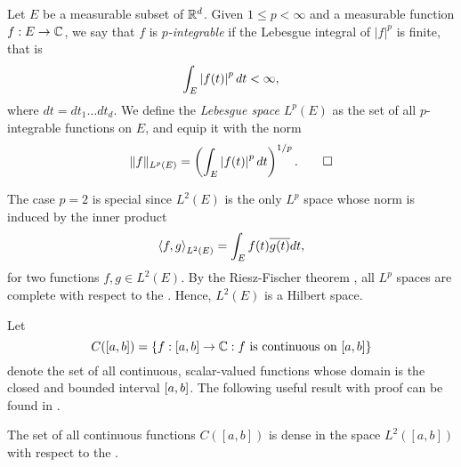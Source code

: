 \documentclass[../thesis.tex]{subfiles}
\begin{document}
\begin{definition}[Lebesgue Space] %
    Let $E$ be a measurable subset of $\mathbb{R}^d$. Given $1 \leq p < \infty$ and a measurable function $f:E\rightarrow \mathbb{C}$, we say that $f$ is \emph{$p$-integrable} if the Lebesgue integral of $|f|^p$ is finite, that is
    \begin{equation*}
        \int_{E} \left|f(t)\right|^p dt < \infty,
    \end{equation*}
    where $dt= dt_1 \dots dt_d$. We define the \emph{Lebesgue space} $L^p(E)$ as the set of all $p$-integrable functions on $E$, and equip it with the norm
    \begin{equation*}
        \|f\|_{L^p(E)} = \left(\int_{E} \left|f(t)\right|^p dt\right)^{1/p}. \qedhere
    \end{equation*}
\end{definition}

The case $p=2$ is special since $L^2(E)$ is the only $L^p$ space whose norm is induced by the inner product
\begin{equation*}
    \left \langle f, g \right \rangle_{L^2(E)} = \int_{E} f(t)\overline{g(t)} dt,
\end{equation*}
for two functions $f,g\in L^2(E)$. By the Riesz-Fischer theorem \cite[p.~279]{heilIntroductionRealAnalysis2019}, all $L^p$ spaces are complete with respect to the \LPnorm. Hence, $L^2(E)$ is a Hilbert space. 


Let
\begin{equation*}  %
    C([a,b]) = \braq{f:[a,b] \rightarrow \mathbb{C}: f \text{ is continuous on } [a,b]}
\end{equation*}
denote the set of all continuous, scalar-valued functions whose domain is the closed and bounded interval $[a,b]$. The following useful result with proof can be found in \cite[p.~326]{rudinPrinciplesMathematicalAnalysis20}. 
\begin{lemma}\label{lem:c_dense_L2}
    The set of all continuous functions $C([a,b])$ is dense in the space $L^2([a,b])$ with respect to the \Ltwonorm.
\end{lemma}
\end{document}
